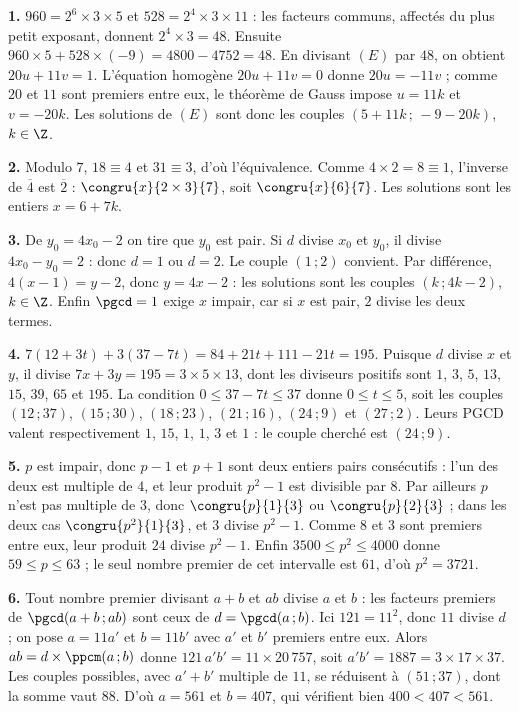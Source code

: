 \begin{corrige}[annales]
\textbf{1.} $960 = 2^{6}\times3\times5$ et $528 = 2^{4}\times3\times11$ : les
facteurs communs, affectés du plus petit exposant, donnent
$2^{4}\times3 = 48$. Ensuite $960\times5+528\times(-9) = 4800-4752 = 48$. En
divisant $(E)$ par $48$, on obtient $20u+11v = 1$. L'équation homogène
$20u+11v = 0$ donne $20u = -11v$ ; comme $20$ et $11$ sont premiers entre eux,
le théorème de Gauss impose $u = 11k$ et $v = -20k$. Les solutions de $(E)$
sont donc les couples $(5+11k\,;\,-9-20k)$, $k \in \Z$.

\textbf{2.} Modulo $7$, $18 \equiv 4$ et $31 \equiv 3$, d'où l'équivalence.
Comme $4\times2 = 8 \equiv 1$, l'inverse de $\overline4$ est $\overline2$ :
$\congru{x}{2\times3}{7}$, soit $\congru{x}{6}{7}$. Les solutions sont les
entiers $x = 6+7k$.

\textbf{3.} De $y_{0} = 4x_{0}-2$ on tire que $y_{0}$ est pair. Si $d$ divise
$x_{0}$ et $y_{0}$, il divise $4x_{0}-y_{0} = 2$ : donc $d = 1$ ou $d = 2$.
Le couple $(1\,;2)$ convient. Par différence, $4(x-1) = y-2$, donc
$y = 4x-2$ : les solutions sont les couples $(k\,;4k-2)$, $k \in \Z$. Enfin
$\pgcd = 1$ exige $x$ impair, car si $x$ est pair, $2$ divise les deux termes.

\textbf{4.} $7(12+3t)+3(37-7t) = 84+21t+111-21t = 195$. Puisque $d$ divise $x$
et $y$, il divise $7x+3y = 195 = 3\times5\times13$, dont les diviseurs
positifs sont $1$, $3$, $5$, $13$, $15$, $39$, $65$ et $195$. La condition
$0 \leq 37-7t \leq 37$ donne $0 \leq t \leq 5$, soit les couples
$(12\,;37)$, $(15\,;30)$, $(18\,;23)$, $(21\,;16)$, $(24\,;9)$ et
$(27\,;2)$. Leurs PGCD valent respectivement $1$, $15$, $1$, $1$, $3$ et $1$ :
le couple cherché est $(24\,;9)$.

\textbf{5.} $p$ est impair, donc $p-1$ et $p+1$ sont deux entiers pairs
consécutifs : l'un des deux est multiple de $4$, et leur produit $p^{2}-1$ est
divisible par $8$. Par ailleurs $p$ n'est pas multiple de $3$, donc
$\congru{p}{1}{3}$ ou $\congru{p}{2}{3}$ ; dans les deux cas
$\congru{p^{2}}{1}{3}$, et $3$ divise $p^{2}-1$. Comme $8$ et $3$ sont
premiers entre eux, leur produit $24$ divise $p^{2}-1$. Enfin
$3500 \leq p^{2} \leq 4000$ donne $59 \leq p \leq 63$ ; le seul nombre premier
de cet intervalle est $61$, d'où $p^{2} = 3721$.

\textbf{6.} Tout nombre premier divisant $a+b$ et $ab$ divise $a$ et $b$ : les
facteurs premiers de $\pgcd(a+b\,;ab)$ sont ceux de $d = \pgcd(a\,;b)$. Ici
$121 = 11^{2}$, donc $11$ divise $d$ ; on pose $a = 11a'$ et $b = 11b'$ avec
$a'$ et $b'$ premiers entre eux. Alors $ab = d \times \ppcm(a\,;b)$ donne
$121\,a'b' = 11 \times 20\,757$, soit $a'b' = 1887 = 3\times17\times37$. Les
couples possibles, avec $a'+b'$ multiple de $11$, se réduisent à
$(51\,;37)$, dont la somme vaut $88$. D'où $a = 561$ et $b = 407$, qui
vérifient bien $400<407<561$.


\end{corrige}
